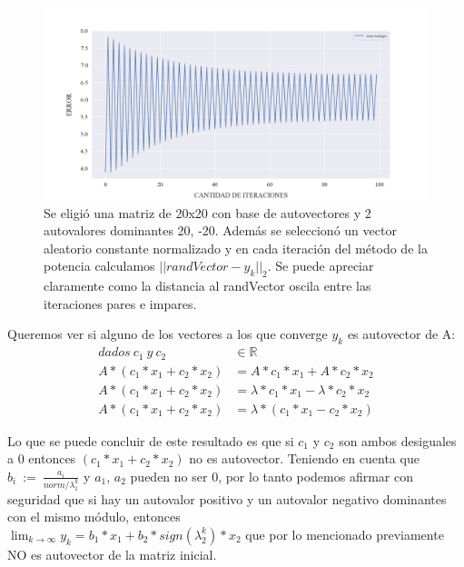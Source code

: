 \begin{figure}[!htbp]
    \includegraphics[scale=0.45]{files/src/.media/op_oscilante.png}
    \caption{Se eligió una matriz de 20x20 con base de autovectores y 2 autovalores dominantes 20, -20. Además se seleccionó un vector aleatorio constante normalizado y en cada iteración del método de la potencia calculamos $||randVector - y_k||_2$. Se puede apreciar claramente como la distancia al randVector oscila entre las iteraciones pares e impares.}
    \label{fig:oscilante}
\end{figure}

\vspace{2em}

Queremos ver si alguno de los vectores a los que converge $y_k$ es autovector de A:
\begin{align}
    dados\ c_1 \ y \ c_2 &\in \mathbb{R} \\
    A * (c_1 * x_1 + c_2 * x_2) &= A * c_1 * x_1 + A * c_2 * x_2 \\
    A * (c_1 * x_1 + c_2 * x_2) &= \lambda * c_1 * x_1 - \lambda * c_2 * x_2 \\
    A * (c_1 * x_1 + c_2 * x_2) &= \lambda * (c_1 * x_1 - c_2 * x_2) 
\end{align}

Lo que se puede concluir de este resultado es que si $c_1$ y $c_2$ son ambos desiguales a 0 entonces $(c_1 * x_1 + c_2 * x_2)$ no es autovector. Teniendo en cuenta que $b_i \ := \ \frac{a_i}{norm / \lambda_{1}^{k}}$ y $a_1$, $a_2$ pueden no ser 0, por lo tanto podemos afirmar con seguridad que si hay un autovalor positivo y un autovalor negativo dominantes con el mismo módulo, entonces \\ $\lim_{k \to \infty} y_k = b_1 * x_1 + b_2 * sign(\lambda_{2}^{k}) * x_2$ que por lo mencionado previamente NO es autovector de la matriz inicial.

\vspace{1em}

